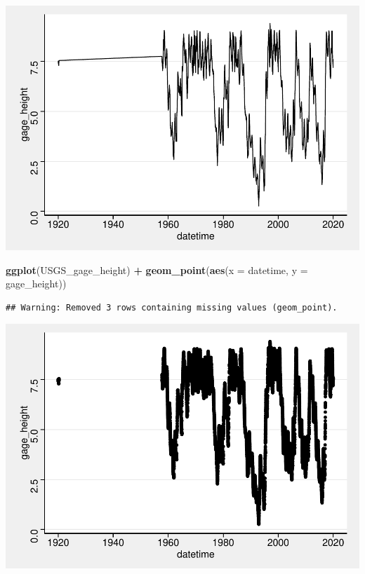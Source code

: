 \documentclass[]{article}
\newenvironment{Shaded}{\begin{snugshade}}{\end{snugshade}}
\newcommand{\DataTypeTok}[1]{\textcolor[rgb]{0.13,0.29,0.53}{#1}}
\newcommand{\KeywordTok}[1]{\textcolor[rgb]{0.13,0.29,0.53}{\textbf{#1}}}
\newcommand{\NormalTok}[1]{#1}
\newcommand{\OperatorTok}[1]{\textcolor[rgb]{0.81,0.36,0.00}{\textbf{#1}}}
\newcommand{\StringTok}[1]{\textcolor[rgb]{0.31,0.60,0.02}{#1}}
\begin{document}
\includegraphics{data_exploration_files/figure-latex/unnamed-chunk-4-1.pdf}

\begin{Shaded}
\begin{Highlighting}[]
\KeywordTok{ggplot}\NormalTok{(USGS_gage_height) }\OperatorTok{+}
\StringTok{  }\KeywordTok{geom_point}\NormalTok{(}\KeywordTok{aes}\NormalTok{(}\DataTypeTok{x =}\NormalTok{ datetime, }\DataTypeTok{y =}\NormalTok{ gage_height))}
\end{Highlighting}
\end{Shaded}

\begin{verbatim}
## Warning: Removed 3 rows containing missing values (geom_point).
\end{verbatim}

\includegraphics{data_exploration_files/figure-latex/unnamed-chunk-4-2.pdf}
\end{document}

